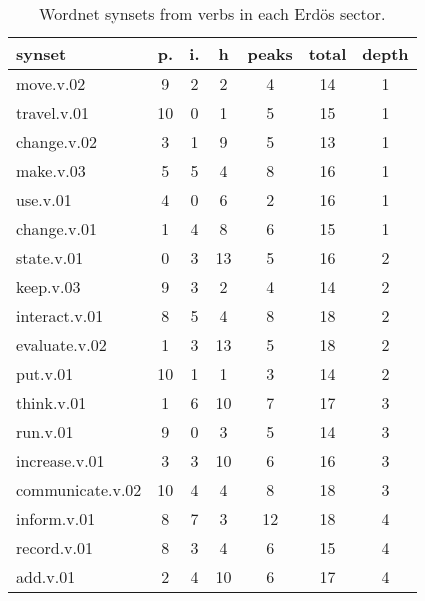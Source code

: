\begin{table}[h!]
\begin{center}
\begin{tabular}{| l | c | c | c | c | c | c |}\hline
synset & p. & i. & h & peaks & total & depth \\\hline
move.v.02 & 9  & 2  & 2  & 4  & 14  & 1 \\\hline
travel.v.01 & 10  & 0  & 1  & 5  & 15  & 1 \\\hline
change.v.02 & 3  & 1  & 9  & 5  & 13  & 1 \\\hline
make.v.03 & 5  & 5  & 4  & 8  & 16  & 1 \\\hline
use.v.01 & 4  & 0  & 6  & 2  & 16  & 1 \\\hline
change.v.01 & 1  & 4  & 8  & 6  & 15  & 1 \\\hline
state.v.01 & 0  & 3  & 13  & 5  & 16  & 2 \\\hline
keep.v.03 & 9  & 3  & 2  & 4  & 14  & 2 \\\hline
interact.v.01 & 8  & 5  & 4  & 8  & 18  & 2 \\\hline
evaluate.v.02 & 1  & 3  & 13  & 5  & 18  & 2 \\\hline
put.v.01 & 10  & 1  & 1  & 3  & 14  & 2 \\\hline
think.v.01 & 1  & 6  & 10  & 7  & 17  & 3 \\\hline
run.v.01 & 9  & 0  & 3  & 5  & 14  & 3 \\\hline
increase.v.01 & 3  & 3  & 10  & 6  & 16  & 3 \\\hline
communicate.v.02 & 10  & 4  & 4  & 8  & 18  & 3 \\\hline
inform.v.01 & 8  & 7  & 3  & 12  & 18  & 4 \\\hline
record.v.01 & 8  & 3  & 4  & 6  & 15  & 4 \\\hline
add.v.01 & 2  & 4  & 10  & 6  & 17  & 4 \\\hline
\end{tabular}
\caption{Wordnet synsets from verbs in each Erd\"os sector.}
\end{center}
\end{table}